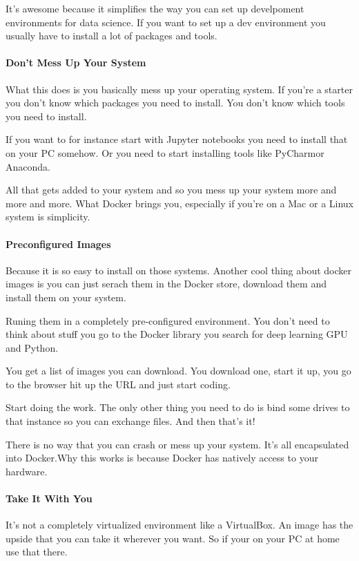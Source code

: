 \documentclass[12pt]{scrartcl} %
\begin{document}
It’s awesome because it simplifies the way you can set up develpoment environments for data science. If you want to set up a dev environment you usually have to install a lot of packages and tools.

\paragraph{Don’t Mess Up Your System}

What this does is you basically mess up your operating system. If you’re a starter you don’t know which packages you need to install. You don’t know which tools you need to install.

If you want to for instance start with Jupyter notebooks you need to install that on your PC somehow. Or you need to start installing tools like PyCharmor Anaconda.

All that gets added to your system and so you mess up your system more and more and more. What Docker brings you, especially if you’re on a Mac or a Linux system is simplicity.

\paragraph{Preconfigured Images}

Because it is so easy to install on those systems. Another cool thing about docker images is you can just serach them in the Docker store, download them and install them on your system.

Runing them in a completely pre-configured environment. You don’t need to think about stuff you go to the Docker library you search for deep learning GPU and Python.

You get a list of images you can download. You download one, start it up, you go to the browser hit up the URL and just start coding.

Start doing the work. The only other thing you need to do is bind some drives to that instance so you can exchange files. And then that’s it!

There is no way that you can crash or mess up your system. It’s all encapsulated into Docker.Why this works is because Docker has natively access to your hardware.

\paragraph{Take It With You}

It’s not a completely virtualized environment like a VirtualBox. An image has the upside that you can take it wherever you want. So if your on your PC at home use that there.
\end{document}
